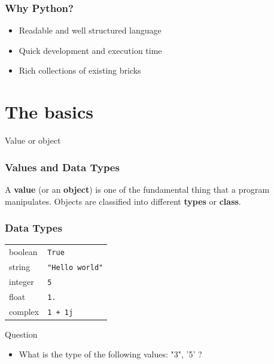 \documentclass[xcolor=dvipsnames]{beamer}
\begin{document}
\begin{frame}
\frametitle{Why Python?}
\begin{itemize}
\item Readable and well structured language
\item Quick development and execution time
\item Rich collections of existing bricks
\end{itemize}
\end{frame}

\section{The basics}

\begin{frame}
\begin{block}{Value or object}
\frametitle{Values and Data Types}
A \textbf{value} (or an \textbf{object}) is one of the fundamental thing that
a program manipulates. Objects are classified into different \textbf{types} or
\textbf{class}.
\end{block}

\vspace{1em}

\end{frame}

\begin{frame}
\frametitle{Data Types}

\begin{tabular}{l | l}
boolean & \texttt{True} \\
string & \texttt{"Hello world"} \\
integer & \texttt{5} \\
float & \texttt{1.} \\ 
complex & \texttt{1 + 1j}
\end{tabular}

\vspace{1em}
\begin{alertblock}{Question}
\begin{itemize}
\item What is the type of the following values: "3", '5' ?
\end{itemize}
\end{alertblock}
\end{frame}
\end{document}
